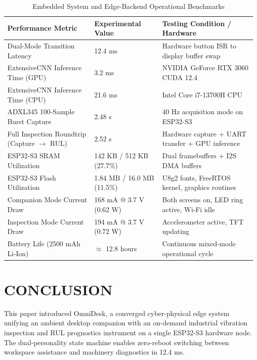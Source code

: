 \documentclass[10pt,journal,onecolumn]{IEEEtran}
\begin{document}
\begin{table}[htbp]
\caption{Embedded System and Edge-Backend Operational Benchmarks}
\begin{center}
\begin{tabular}{lll}
\toprule
\textbf{Performance Metric} & \textbf{Experimental Value} & \textbf{Testing Condition / Hardware} \\
\midrule
Dual-Mode Transition Latency & 12.4 ms & Hardware button ISR to display buffer swap \\
ExtensiveCNN Inference Time (GPU) & 3.2 ms & NVIDIA GeForce RTX 3060 CUDA 12.4 \\
ExtensiveCNN Inference Time (CPU) & 21.6 ms & Intel Core i7-13700H CPU \\
ADXL345 100-Sample Burst Capture & 2.48 s & 40 Hz acquisition mode on ESP32-S3 \\
Full Inspection Roundtrip (Capture $\to$ RUL) & 2.52 s & Hardware capture + UART transfer + GPU inference \\
ESP32-S3 SRAM Utilization & 142 KB / 512 KB (27.7\%) & Dual framebuffers + I2S DMA buffers \\
ESP32-S3 Flash Utilization & 1.84 MB / 16.0 MB (11.5\%) & U8g2 fonts, FreeRTOS kernel, graphics routines \\
Companion Mode Current Draw & 168 mA @ 3.7 V (0.62 W) & Both screens on, LED ring active, Wi-Fi idle \\
Inspection Mode Current Draw & 194 mA @ 3.7 V (0.72 W) & Accelerometer active, TFT updating \\
Battery Life (2500 mAh Li-Ion) & $\approx$ 12.8 hours & Continuous mixed-mode operational cycle \\
\bottomrule
\end{tabular}
\end{center}
\label{tab:benchmarks}
\end{table}

\section{CONCLUSION}
This paper introduced OmniDesk, a converged cyber-physical edge system unifying an ambient desktop companion with an on-demand industrial vibration inspection and RUL prognostics instrument on a single ESP32-S3 hardware node. The dual-personality state machine enables zero-reboot switching between workspace assistance and machinery diagnostics in 12.4 ms.
\end{document}

